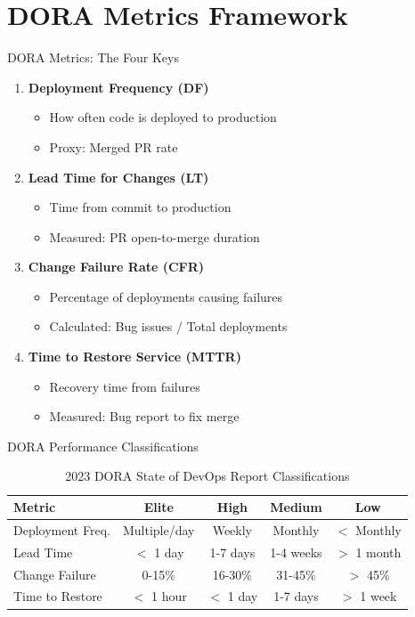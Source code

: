 \documentclass[aspectratio=169]{beamer}
\begin{document}
\section{DORA Metrics Framework}

\begin{frame}{DORA Metrics: The Four Keys}
  \begin{enumerate}
    \item \textbf{Deployment Frequency (DF)}
    \begin{itemize}
      \item How often code is deployed to production
      \item Proxy: Merged PR rate
    \end{itemize}

    \item \textbf{Lead Time for Changes (LT)}
    \begin{itemize}
      \item Time from commit to production
      \item Measured: PR open-to-merge duration
    \end{itemize}

    \item \textbf{Change Failure Rate (CFR)}
    \begin{itemize}
      \item Percentage of deployments causing failures
      \item Calculated: Bug issues / Total deployments
    \end{itemize}

    \item \textbf{Time to Restore Service (MTTR)}
    \begin{itemize}
      \item Recovery time from failures
      \item Measured: Bug report to fix merge
    \end{itemize}
  \end{enumerate}
\end{frame}

\begin{frame}{DORA Performance Classifications}
  \begin{table}
    \centering
    \small
    \begin{tabular}{@{}lcccc@{}}
      \toprule
      \textbf{Metric} & \textbf{Elite} & \textbf{High} & \textbf{Medium} & \textbf{Low} \\
      \midrule
      Deployment Freq. & Multiple/day & Weekly & Monthly & $<$ Monthly \\
      Lead Time & $<$ 1 day & 1-7 days & 1-4 weeks & $>$ 1 month \\
      Change Failure & 0-15\% & 16-30\% & 31-45\% & $>$ 45\% \\
      Time to Restore & $<$ 1 hour & $<$ 1 day & 1-7 days & $>$ 1 week \\
      \bottomrule
    \end{tabular}
    \caption{2023 DORA State of DevOps Report Classifications}
  \end{table}
\end{frame}
\end{document}
